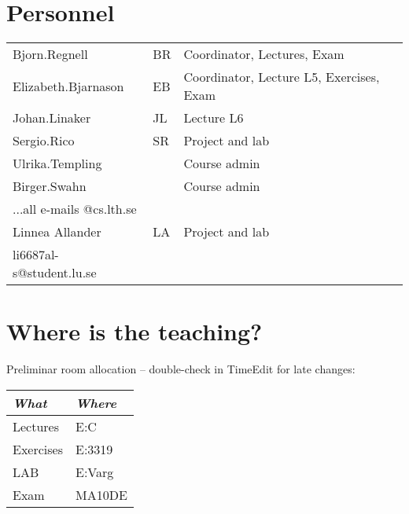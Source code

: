 \section{Personnel}
\begin{flushleft}
	\setlength{\tabcolsep}{0pt}
	\begin{tabular}{p{} p{} p{}}
		Bjorn.Regnell & BR & Coordinator, Lectures, Exam \\
		Elizabeth.Bjarnason & EB & Coordinator, Lecture L5, Exercises, Exam \\
		Johan.Linaker & JL & Lecture L6\\
		Sergio.Rico & SR & Project and lab \\
		Ulrika.Templing & & Course admin \\
		Birger.Swahn & & Course admin \\
		...all e-mails @cs.lth.se\\
		Linnea Allander & LA & Project and lab \\
		li6687al-s@student.lu.se\\
	\end{tabular}
\end{flushleft}

\section{Where is the teaching?}

\noindent Preliminar room allocation -- double-check in TimeEdit for late changes:
\begin{flushleft}
\small
\begin{tabular}{l | l } 
{\it What} & {\it Where} \\
\hline
Lectures & E:C %
\\
Exercises & E:3319 %
\\
LAB& E:Varg %
\\
Exam & MA10DE\\
\end{tabular}
\end{flushleft}

